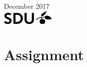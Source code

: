 \documentclass[a4paper]{report}
\theoremstyle{plain}
\begin{document}
\begin{titlepage}


{\large December 2017}\\[2cm] %


\includegraphics{SDU_logo.png}\\[.5cm] %
 

\vfill %

\end{titlepage}
%

%

\clearpage

\tableofcontents


\chapter{Assignment} 
    
    
\end{document}
